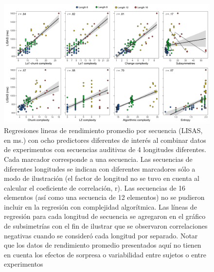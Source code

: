 \begin{figure}[t!]
   \includegraphics[scale=0.8]{figuras/plosbio/journal.pcbi.1008598.g009.PNG}
   
   \centering

   \caption{Regresiones lineas de rendimiento promedio por secuencia (LISAS, en ms.) con ocho predictores diferentes de interés al combinar datos de experimentos con secuencias auditivas de 4 longitudes diferentes. Cada marcador corresponde a una secuencia. Las secuencias de diferentes longitudes se indican con diferentes marcadores sólo a modo de ilustración (el factor de longitud no se tuvo en cuenta al calcular el coeficiente de correlación, r). Las secuencias de 16 elementos (así como una secuencia de 12 elementos) no se pudieron incluir en la regresión con complejidad algorítmica. Las líneas de regresión para cada longitud de secuencia se agregaron en el gráfico de subsimetrías con el fin de ilustrar que se observaron correlaciones negativas cuando se consideró cada longitud por separado. Notar que los datos de rendimiento promedio presentados aquí no tienen en cuenta los efectos de sorpresa o variabilidad entre sujetos o entre experimentos}
   \label{PlosBIO-F9}
\end{figure}

